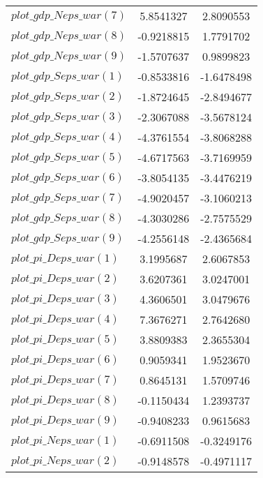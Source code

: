 \begin{center}
\begin{longtable}{lcc}
$plot\_gdp\_N eps\_war (7)  $	 & 	      5.8541327	 & 	      2.8090553 \\ 
$plot\_gdp\_N eps\_war (8)  $	 & 	     -0.9218815	 & 	      1.7791702 \\ 
$plot\_gdp\_N eps\_war (9)  $	 & 	     -1.5707637	 & 	      0.9899823 \\ 
$plot\_gdp\_S eps\_war (1)  $	 & 	     -0.8533816	 & 	     -1.6478498 \\ 
$plot\_gdp\_S eps\_war (2)  $	 & 	     -1.8724645	 & 	     -2.8494677 \\ 
$plot\_gdp\_S eps\_war (3)  $	 & 	     -2.3067088	 & 	     -3.5678124 \\ 
$plot\_gdp\_S eps\_war (4)  $	 & 	     -4.3761554	 & 	     -3.8068288 \\ 
$plot\_gdp\_S eps\_war (5)  $	 & 	     -4.6717563	 & 	     -3.7169959 \\ 
$plot\_gdp\_S eps\_war (6)  $	 & 	     -3.8054135	 & 	     -3.4476219 \\ 
$plot\_gdp\_S eps\_war (7)  $	 & 	     -4.9020457	 & 	     -3.1060213 \\ 
$plot\_gdp\_S eps\_war (8)  $	 & 	     -4.3030286	 & 	     -2.7575529 \\ 
$plot\_gdp\_S eps\_war (9)  $	 & 	     -4.2556148	 & 	     -2.4365684 \\ 
$plot\_pi\_D eps\_war (1)   $	 & 	      3.1995687	 & 	      2.6067853 \\ 
$plot\_pi\_D eps\_war (2)   $	 & 	      3.6207361	 & 	      3.0247001 \\ 
$plot\_pi\_D eps\_war (3)   $	 & 	      4.3606501	 & 	      3.0479676 \\ 
$plot\_pi\_D eps\_war (4)   $	 & 	      7.3676271	 & 	      2.7642680 \\ 
$plot\_pi\_D eps\_war (5)   $	 & 	      3.8809383	 & 	      2.3655304 \\ 
$plot\_pi\_D eps\_war (6)   $	 & 	      0.9059341	 & 	      1.9523670 \\ 
$plot\_pi\_D eps\_war (7)   $	 & 	      0.8645131	 & 	      1.5709746 \\ 
$plot\_pi\_D eps\_war (8)   $	 & 	     -0.1150434	 & 	      1.2393737 \\ 
$plot\_pi\_D eps\_war (9)   $	 & 	     -0.9408233	 & 	      0.9615683 \\ 
$plot\_pi\_N eps\_war (1)   $	 & 	     -0.6911508	 & 	     -0.3249176 \\ 
$plot\_pi\_N eps\_war (2)   $	 & 	     -0.9148578	 & 	     -0.4971117 \\ 

\end{longtable}
\end{center}
